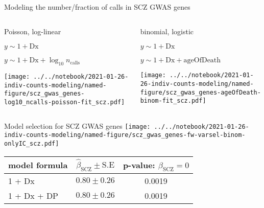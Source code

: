 \documentclass[usenames,dvipsnames]{beamer}
\begin{document}
\begin{frame}{Modeling the number/fraction of calls in SCZ GWAS genes}
\begin{columns}[t]
\begin{column}{0.5\textwidth}
\begin{center}
Poisson, log-linear
\begin{description}
\tiny
\item[M0] \(y \sim 1 + \mathrm{Dx}\)
\item[M1] \(y \sim 1 + \mathrm{Dx} + \log_{10} n_\mathrm{calls}\)
\end{description}
\end{center}
\texttt{[image: ../../notebook/2021-01-26-indiv-counts-modeling/named-figure/scz\_gwas\_genes-log10\_ncalls-poisson-fit\_scz.pdf]}
\end{column}

\begin{column}{0.5\textwidth}
\begin{center}
binomial, logistic
\begin{description}
\tiny
\item[M0] \(y \sim 1 + \mathrm{Dx}\)
\item[M1] \(y \sim 1 + \mathrm{Dx} + \mathrm{ageOfDeath}\)
\end{description}
\end{center}
\texttt{[image: ../../notebook/2021-01-26-indiv-counts-modeling/named-figure/scz\_gwas\_genes-ageOfDeath-binom-fit\_scz.pdf]}
\end{column}
\end{columns}
\begin{center}
\end{center}
\end{frame}

\begin{frame}{Model selection for SCZ GWAS genes}
\small
\texttt{[image: ../../notebook/2021-01-26-indiv-counts-modeling/named-figure/scz\_gwas\_genes-fw-varsel-binom-onlyIC\_scz.pdf]}

\begin{center}
\tiny
\begin{tabular}{l|cc}
model formula & \(\hat{\beta}_\mathrm{SCZ} \pm \mathrm{S.E}\) & p-value: \(\beta_\mathrm{SCZ} = 0\) \\
\hline
1 + Dx & \(0.80 \pm 0.26\) & 0.0019 \\
1 + Dx + DP & \(0.80 \pm 0.26\) & 0.0019 \\
\end{tabular}
\end{center}
\end{frame}
\end{document}
